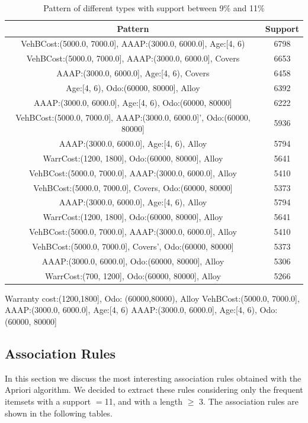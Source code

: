 \documentclass{article}
\begin{document}
	\begin{table}[H]
		\centering
		\begin{tabular}{|c|c|}
			\hline
			\textbf{Pattern} & \textbf{Support} \\
			\hline
			\rowcolor{Gray}
			VehBCost:(5000.0, 7000.0], AAAP:(3000.0, 6000.0], Age:[4, 6) &  6798\\
			VehBCost:(5000.0, 7000.0], AAAP:(3000.0, 6000.0], Covers &  6653\\
			\rowcolor{Gray}
			AAAP:(3000.0, 6000.0], Age:[4, 6), Covers &  6458\\
			Age:[4, 6), Odo:(60000, 80000], Alloy &  6392\\
			\rowcolor{Gray}
			AAAP:(3000.0, 6000.0], Age:[4, 6), Odo:(60000, 80000] &  6222\\
			VehBCost:(5000.0, 7000.0], AAAP:(3000.0, 6000.0]', Odo:(60000, 80000]  & 5936\\
			\rowcolor{Gray}
			AAAP:(3000.0, 6000.0], Age:[4, 6), Alloy &  5794\\
			WarrCost:(1200, 1800], Odo:(60000, 80000], Alloy & 5641\\
			\rowcolor{Gray}
			VehBCost:(5000.0, 7000.0], AAAP:(3000.0, 6000.0], Alloy &  5410\\
			VehBCost:(5000.0, 7000.0], Covers, Odo:(60000, 80000] & 5373\\
			\rowcolor{Gray}
			AAAP:(3000.0, 6000.0], Age:[4, 6), Alloy & 5794\\
			WarrCost:(1200, 1800], Odo:(60000, 80000], Alloy & 5641\\
			\rowcolor{Gray}
			VehBCost:(5000.0, 7000.0], AAAP:(3000.0, 6000.0], Alloy & 5410\\
			VehBCost:(5000.0, 7000.0], Covers', Odo:(60000, 80000] & 5373\\
			\rowcolor{Gray}
			AAAP:(3000.0, 6000.0], Odo:(60000, 80000], Alloy & 5306\\
			WarrCost:(700, 1200], Odo:(60000, 80000], Alloy & 5266\\\hline
		\end{tabular}
		\caption{Pattern of different types with support between 9\% and 11\%}
	\end{table}
	
	
	
	Warranty cost:(1200,1800], Odo: (60000,80000), Alloy
	VehBCost:(5000.0, 7000.0], AAAP:(3000.0, 6000.0], Age:[4, 6)
	AAAP:(3000.0, 6000.0], Age:[4, 6), Odo:(60000, 80000]
	
	\subsection{Association Rules}
	In this section we discuss the most interesting association rules obtained with the Apriori algorithm. 
	We decided to extract these rules considering only the frequent itemsets with a support $=$11, and with a length $\ge$ 3. 
	The association rules are shown in the following tables.  
	
\end{document}

